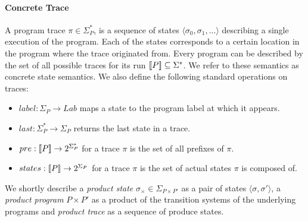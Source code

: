 \paragraph{Concrete Trace} 
A program trace $\pi \in \Sigma^*_{P}$, is a sequence of states $\langle \sigma_0,\sigma_1,... \rangle$ describing a single execution of the program. Each of the states corresponds to a certain location in the program where the trace originated from. Every program can be described by the set of all possible traces for its run $\lbrack\!\lbrack P \rbrack\!\rbrack \subseteq \Sigma^*$. We refer to these semantics as concrete state semantics. We also define the following standard operations on traces:
\begin{itemize}
\item $label : \Sigma_{P} \rightarrow Lab$ maps a state to the program label at which it appears.
\item $last : \Sigma_{P}^* \rightarrow \Sigma_{P}$ returns the last state in a trace.
\item $pre : \lbrack\!\lbrack P \rbrack\!\rbrack \rightarrow 2^{\Sigma_{P}^*}$ for a trace $\pi$ is the set of all prefixes of $\pi$.
\item $states : \lbrack\!\lbrack P \rbrack\!\rbrack \rightarrow 2^{\Sigma_{P}}$ for a trace $\pi$ is the set of actual states $\pi$ is composed of.
\end{itemize}


We shortly describe a \emph{product state} $\sigma_{\times} \in \Sigma_{P \times P'}$ as a pair of states $\langle \sigma,\sigma' \rangle$, a \emph{product program} $P \times P'$ as a product of the transition systems of the underlying programs and \emph{product trace} as a sequence of produce states.

